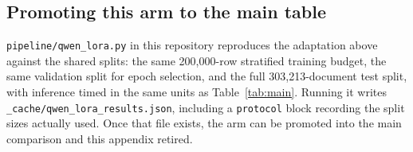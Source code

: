 \subsection{Promoting this arm to the main table}

\texttt{pipeline/qwen\_lora.py} in this repository reproduces the adaptation
above against the shared splits: the same 200,000-row stratified training
budget, the same validation split for epoch selection, and the full
303,213-document test split, with inference timed in the same units as
Table~\ref{tab:main}. Running it writes
\texttt{\_cache/qwen\_lora\_results.json}, including a \texttt{protocol} block
recording the split sizes actually used. Once that file exists, the arm can be
promoted into the main comparison and this appendix retired.
